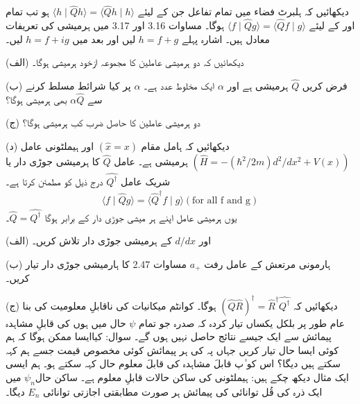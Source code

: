 دیکھائیں کہ ہلبرٹ فضاء میں تمام تفاعل  جن کے لیئے \(\langle h\mid\hat{Q}h \rangle = \langle \hat{Q}h\mid h \rangle\) ہو تب تمام  اور  کے لیئے \(\langle f\mid\hat{Q}g \rangle = \langle \hat{Q}f\mid g \rangle\) ہوگا۔ مساوات \num{3.16} اور \num{3.17} میں ہرمیشی کی تعریفات معادل ہیں۔ اشارہ پہلے \(h = f+g\) لیں اور بعد میں \(h = f+ig\) لیں۔

(الف) دیکھائیں کہ دو ہرمیشی عاملین کا مجموعہ ازخود ہرمیشی ہوگا۔

(ب) فرض کریں \(\hat{Q}\) ہرمیشی ہے اور \(\alpha\) ایک مخلوط عدد ہے۔ \(\alpha\) پر کیا شرائط مسلط کرنے سے \(\alpha\hat{Q}\) بھی ہرمیشی ہوگا؟

(ج) دو ہرمیشی عاملین کا حاصل ضرب کب ہرمیشی ہوگا؟

(د) دیکھائیں کہ ہامل مقام \((\hat{x} = x)\) اور ہیملٹونی عامل \((\hat{H} = -(\hbar^{2}/2m)d^{2}/dx^{2}+V(x))\) ہرمیشی ہے۔
عامل \(\hat{Q}\) کا ہرمیشی جوڑی دار یا شریک عامل \(\hat{Q^\dagger}\) درج ذیل کو مطمئن کرتا ہے۔
\begin{align}
	\langle f\mid\hat{Q}g\rangle = \langle \hat{Q}^{\dagger}f\mid g\rangle (\text{for all f and g})
\end{align}
یوں ہرمیشی عامل اپنے ہر میشی جوڑی دار کے برابر ہوگا \(\hat{Q} = \hat{Q^\dagger}\)۔

(الف)  اور \(d/dx\) کے ہرمیشی جوڑی دار تلاش کریں۔

(ب) ہارمونی مرتعش کے عامل رفت \(a_+\) مساوات \num{2.47} کا ہارمیشی جوڑی دار تیار کریں۔

(ج) دیکھائیں کہ \((\hat{Q}\hat{R})^\dagger = \hat{R}^\dagger \hat{Q^\dagger}\) ہوگا۔
کوانٹم میکانیات کی ناقابلِ معلومیت کی بنا عام طور پر بلکل یکساں تیار کردہ کہ صدرہ جو تمام \(\psi\) حال میں ہوں کی قابلِ مشاہدہ  پیمائش سے ایک جیسے نتائج حاصل نہیں ہوں گے۔ سوال: کیاایسا ممکن ہوگا کہ ہم کوئی ایسا حال تیار کریں جہاں پہ  کی ہر پیمائش کوئی مخصوص قیمت جسے ہم  کہہ سکتے ہیں دیگا؟ اس کو ٰپ قابلَ مشاہدہ  کی قابلَ معلوم حال کہہ سکتے ہو۔ ہم ایسی ایک مثال دیکھ چکے ہیں: ہیملٹونی کی ساکن حالات قابلِ معلوم ہے۔ ساکن حال\(\psi_n\) میں ایک ذرہ کی قُل توانائی کی پیمائش ہر صورت مطابقتی اجازتی توانائی \(E_n\) دیگا۔

